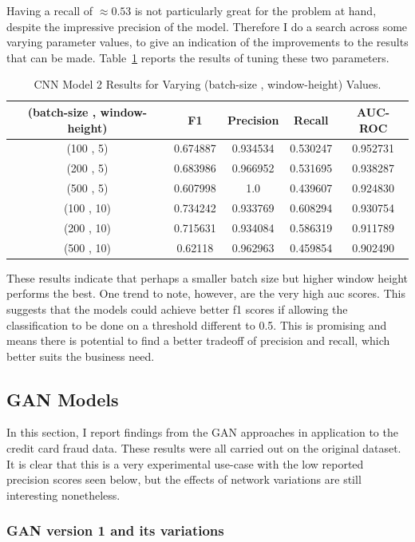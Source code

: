 \documentclass[12pt,a4paper,twoside]{report}
\begin{document}
Having a recall of $ \approx0.53 $ is not particularly great for the problem at hand, despite the impressive precision of the model. Therefore I do a search across some varying parameter values, to give an indication of the improvements to the results that can be made. Table~\ref{table:cnnv2-results-tuning} reports the results of tuning these two parameters.

\begin{table}[H]  
  \centering
  \begin{tabular}{ccccc}
    \toprule
     (batch-size , window-height) & F1 & Precision & Recall & AUC-ROC \\ \midrule
    (100 , 5) & 0.674887 & 0.934534 & 0.530247 & 0.952731  \\
    (200 , 5) & 0.683986 & 0.966952 & 0.531695 & 0.938287 \\
    (500 , 5) & 0.607998 &1.0 & 0.439607 & 0.924830 \\
    (100 , 10) & 0.734242 & 0.933769 & 0.608294 & 0.930754 \\
    (200 , 10) & 0.715631 & 0.934084 & 0.586319 & 0.911789 \\
    (500 , 10) & 0.62118 & 0.962963 & 0.459854 & 0.902490\\
   \bottomrule
 \end{tabular}
 \caption{CNN Model 2 Results for Varying (batch-size , window-height) Values.}
\label{table:cnnv2-results-tuning}
\end{table}

These results indicate that perhaps a smaller batch size but higher window height performs the best. One trend to note, however, are the very high auc scores. This suggests that the models could achieve better f1 scores if allowing the classification to be done on a threshold different to 0.5. This is promising and means there is potential to find a better tradeoff of precision and recall, which better suits the business need.

\subsection{GAN Models}
In this section, I report findings from the GAN approaches in application to the credit card fraud data. These results were all carried out on the original dataset. It is clear that this is a very experimental use-case with the low reported precision scores seen below, but the effects of network variations are still interesting nonetheless.

\subsubsection{GAN version 1 and its variations}
\end{document}
